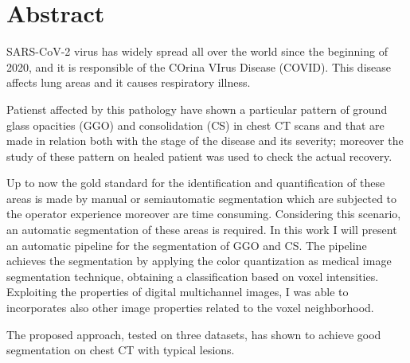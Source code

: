 \documentclass{standalone}
\begin{document}
	\chapter*{Abstract}

	SARS-CoV-2 virus has widely spread all over the world since the beginning of 2020, and it is responsible of the COrina VIrus Disease (COVID). This disease affects lung areas and it causes respiratory illness. 
		
	Patienst affected by this pathology have shown a particular pattern of ground glass opacities (GGO) and consolidation (CS) in chest CT scans and that are  made in relation both with the stage of the disease and its severity; moreover the study of these pattern on healed patient was used to check the actual recovery.
	
	Up to now the gold standard for the identification and quantification of these areas is made by manual or semiautomatic segmentation which are subjected to the operator experience moreover are time consuming. 	Considering this scenario, an automatic segmentation of these areas is required. 
	In this work I will present an automatic pipeline for the segmentation of GGO and CS. The pipeline achieves the segmentation by applying the color quantization as medical image segmentation technique, obtaining a classification based on voxel intensities. Exploiting the properties of digital multichannel images, I was able to incorporates also other image properties related to the voxel neighborhood. 
	
	The proposed approach, tested on three datasets, has shown to achieve good segmentation on chest CT with typical lesions. 
\end{document}
